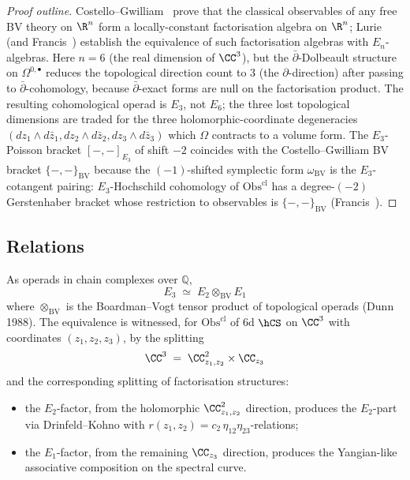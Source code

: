 \begin{proof}[Proof outline]
Costello--Gwilliam~\cite{CG17} prove that the classical observables of
any free BV theory on $\R^n$ form a locally-constant factorisation
algebra on $\R^n$; Lurie \cite{HA} (and
Francis~\cite{francis2013tangent}) establish the equivalence of such
factorisation algebras with $E_n$-algebras. Here $n = 6$ (the real
dimension of $\CC^3$), but the $\bar\partial$-Dolbeault structure on
$\Omega^{0,\bullet}$ reduces the topological direction count to $3$
(the $\partial$-direction) after passing to $\bar\partial$-cohomology,
because $\bar\partial$-exact forms are null on the factorisation
product. The resulting cohomological operad is $E_3$, not $E_6$; the
three lost topological dimensions are traded for the three
holomorphic-coordinate degeneracies
$(dz_1\wedge d\bar z_1, dz_2\wedge d\bar z_2, dz_3\wedge d\bar z_3)$
which $\Omega$ contracts to a volume form.
The $E_3$-Poisson bracket $[-,-]_{E_3}$ of
shift $-2$ coincides with the
Costello--Gwilliam BV bracket $\{-,-\}_{\mathrm{BV}}$ because the
$(-1)$-shifted symplectic form $\omega_{\mathrm{BV}}$ is the
$E_3$-cotangent pairing: $E_3$-Hochschild cohomology of
$\mathrm{Obs}^{\mathrm{cl}}$ has a degree-$(-2)$ Gerstenhaber bracket
whose restriction to observables is $\{-,-\}_{\mathrm{BV}}$
(Francis~\cite{francis2013tangent}).
\end{proof}

\subsection{Relations}
\label{subsec:E3-relations}

\begin{theorem}
\label{thm:dunn-E3-6d-hCS}
As operads in chain complexes over $\mathbb{Q}$,
\[
E_3 \;\simeq\; E_2\otimes_{\mathrm{BV}} E_1
\]
where $\otimes_{\mathrm{BV}}$ is the Boardman--Vogt tensor product
of topological operads (Dunn 1988). The equivalence is witnessed,
for $\mathrm{Obs}^{\mathrm{cl}}$ of 6d $\hCS$ on $\CC^3$ with
coordinates $(z_1,z_2,z_3)$, by the splitting
\[
\CC^3 \;=\; \CC^2_{z_1,z_2} \times \CC_{z_3}
\]
and the corresponding splitting of factorisation structures:
\begin{itemize}
\item the $E_2$-factor, from the holomorphic $\CC^2_{z_1,z_2}$
direction, produces the $E_2$-part via Drinfeld--Kohno with
$r(z_1,z_2) = c_2\,\eta_{12}\eta_{23}$-relations;
\item the $E_1$-factor, from the remaining $\CC_{z_3}$ direction,
produces the Yangian-like associative composition on the spectral
curve.
\end{itemize}
\end{theorem}

